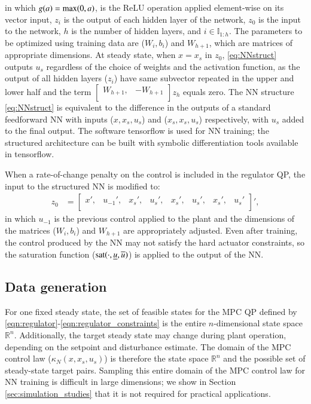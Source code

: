 \documentclass[preprint,5p, twocolumn, authoryear]{elsarticle}
\newcommand{\bbI}{\mathbb{I}}
\newcommand{\bbR}{\mathbb{R}}
\begin{document}
in which $g(a) = \textnormal{max} (0, a)$, is the ReLU operation applied
element-wise on its vector input, $z_i$ is the output of each hidden layer of
the network, $z_0$ is the input to the network, $h$ is the number of hidden
layers, and $i \in \bbI_{1:h}$. The parameters to be optimized using training
data are ($W_i, b_i$) and $W_{h+1}$, which are matrices of appropriate
dimensions. At steady state, when $x=x_s$ in $z_0$, \eqref{eq:NNstruct} outputs
$u_s$ regardless of the choice of weights and the activation function, as the
output of all hidden layers ($z_i$) have same subvector repeated in the upper
and lower half and the term $\begin{bmatrix} W_{h + 1}, & -W_{h+ 1} \\
      \end{bmatrix} z_h$ equals zero. The NN structure \eqref{eq:NNstruct} is
equivalent to the difference in the outputs of a standard feedforward NN with
inputs ($x, x_s, u_s$) and ($x_s, x_s, u_s$) respectively, with $u_s$ added to
the final output. The software tensorflow
\citep{abadi:agarwal:barham:brevdo:et-al:2015} is used for NN training; the
structured architecture can be built with symbolic differentiation tools
available in tensorflow. 

When a rate-of-change penalty on the control is included in the regulator QP,
the input to the structured NN is modified to:
\begin{align*}
    z_0 &= 
    \begin{bmatrix}
    x', & u_{-1}', & x_s', & u_s', & x_s', & u_s', & x_s', & u_s' \\
    \end{bmatrix}',
\end{align*}
in which $u_{-1}$ is the previous control applied to the plant and the
dimensions of the matrices ($W_i, b_i$) and $W_{h+1}$ are appropriately
adjusted. Even after training, the control produced by the NN may not satisfy
the hard actuator constraints, so the saturation function
($\textnormal{sat}(\cdot, \underline{u}, \overline{u})$) is applied to the
output of the NN.

\subsection{Data generation}

For one fixed steady state, the set of feasible states for the MPC QP defined by
\eqref{eqn:regulator}-\eqref{eqn:regulator_constraints} is the entire
$n$-dimensional state space $\bbR^n$. Additionally, the target steady state may
change during plant operation, depending on the setpoint and disturbance
estimate. The domain of the MPC control law ($\kappa_N(x, x_s, u_s)$) is
therefore the state space $\bbR^{n}$ and the possible set of steady-state target
pairs. Sampling this entire domain of the MPC control law for NN training is
difficult in large dimensions; we show in Section \ref{sec:simulation_studies}
that it is not required for practical applications. 
\end{document}
